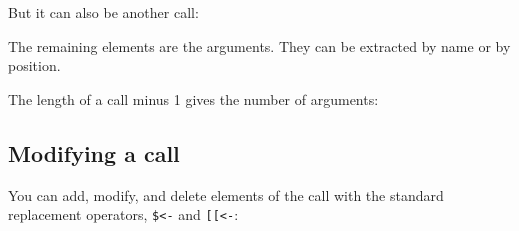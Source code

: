 But it can also be another call:

\begin{Shaded}
\begin{Highlighting}[]
\StringTok{ }\NormalTok{(}\NormalTok{(}\NormalTok{)(}\NormalTok{))}
\NormalTok{y[[}\NormalTok{]]}
\NormalTok{(y[[}\NormalTok{]])}
\end{Highlighting}
\end{Shaded}

The remaining elements are the arguments. They can be extracted by name
or by position.

\begin{Shaded}
\begin{Highlighting}[]
\StringTok{ }\NormalTok{(}\NormalTok{(}\NormalTok{, } \NormalTok{))}
\NormalTok{x[[}\NormalTok{]]}
\end{Highlighting}
\end{Shaded}

The length of a call minus 1 gives the number of arguments:

\begin{Shaded}
\begin{Highlighting}[]
\StringTok{ }
\end{Highlighting}
\end{Shaded}

\subsection{Modifying a call}

You can add, modify, and delete elements of the call with the standard
replacement operators, \texttt{\$\textless{}-} and
\texttt{{[}{[}\textless{}-}: 

